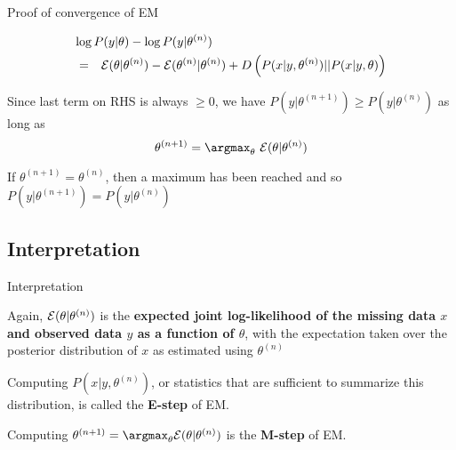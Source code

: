 \documentclass{beamer}
\begin{document}
\begin{frame}{Proof of convergence of EM}

\begin{eqnarray*}
\lefteqn{\log P(y|\theta) - \log P(y|\theta^{(n)})} \\
& = & {\cal E}(\theta|\theta^{(n)}) - {\cal E}(\theta^{(n)}|\theta^{(n)}) + D\left(P(x|y,\theta^{(n)}) || P(x|y,\theta)\right)
\end{eqnarray*}

\itemb
  \item Since last term on RHS is always $\geq 0$, we have $P(y|\theta^{(n+1)}) \geq P(y|\theta^{(n)})$ as long as
\[
\theta^{(n+1)} = \argmax_{\theta}\ {\cal E}(\theta|\theta^{(n)})
\]
  \item If $\theta^{(n+1)} = \theta^{(n)}$, then a maximum has been reached and so $P(y|\theta^{(n+1)}) = P(y|\theta^{(n)})$
 \iteme

\end{frame}

\subsection{Interpretation}

\begin{frame}{Interpretation}

\itemb
  \item Again, ${\cal E}(\theta|\theta^{(n)})$ is the {\bf expected joint log-likelihood of the missing data $x$ and observed data $y$ as a function of $\theta$},
with the expectation taken over the posterior distribution of $x$ as estimated using $\theta^{(n)}$
  \item Computing $P(x|y,\theta^{(n)})$, or statistics that are sufficient to summarize this distribution, is called the {\bf E-step} of EM.
  \item Computing $\theta^{(n+1)} = \argmax_{\theta} {\cal E}(\theta|\theta^{(n)})$ is the {\bf M-step} of EM.
 \iteme

\end{frame}
\end{document}
